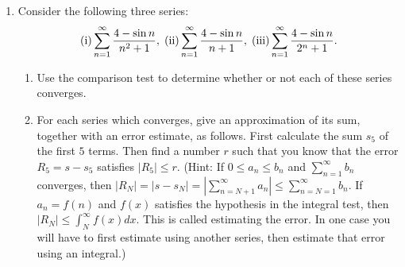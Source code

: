\documentclass[12pt]{article}
\begin{document}
\begin{enumerate}
\begin{enumerate}
\end{enumerate}

\item Consider the following three series: 
$$(\mbox{\rm i})\sum_{n=1}^{\infty}\frac{4-\sin n}{n^{2}+1},\;
(\mbox{\rm ii}) 
\sum_{n=1}^{\infty}\frac{4-\sin n}{n+1},\;
(\mbox{\rm iii}) 
\sum_{n=1}^{\infty}\frac{4-\sin n}{2^{n}+1}.$$

\begin{enumerate}

\item Use the comparison test to determine whether or not each of 
these series converges. 

\item For each series which converges, give an approximation of 
its sum, together with an error 
estimate, as follows. First calculate the sum $s_{5}$
of the first $5$ terms. Then find a number $r$ such that 
you know that the error $R_{5}=s-s_{5}$ satisfies 
$|R_{5}|\le r$. (Hint: If $0\le a_{n}\le b_{n}$ and $\sum_{n=1}^{\infty}b_{n}$
converges, then $|R_{N}|=|s-s_{N}|=|\sum_{n=N+1}^{\infty}a_{n}|\le 
\sum_{n=N=1}^{\infty}b_{n}$. If $a_{n}=f(n)$ and $f(x)$ satisfies the 
hypothesis in the integral test, then $|R_{N}|\le 
\int_{N}^{\infty}f(x)dx$. 
This is called estimating the error. In one case you will have to 
first estimate using another series, then 
estimate that error using an integral.) 

\end{enumerate}


\end{enumerate}
\end{document}
